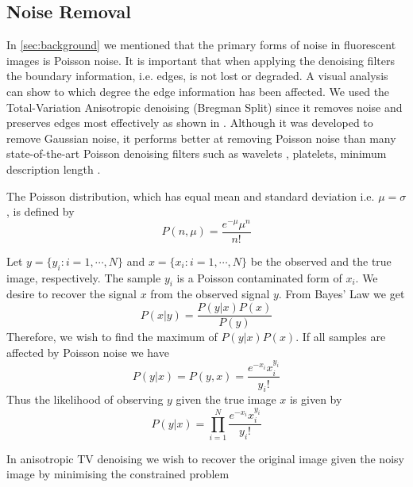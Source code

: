 \documentclass[a4paper,11pt]{ijamas}
\begin{document}
\subsection{Noise Removal}
\label{sec:proposed_noise_removal}
In \autoref{sec:background} we mentioned that the primary forms of noise in fluorescent images is Poisson noise. It is important that when applying the denoising filters the boundary information, i.e. edges, is not lost or degraded. A visual analysis can show to which degree the edge information has been affected.
We used the Total-Variation Anisotropic denoising (Bregman Split) since it removes noise and preserves edges most effectively as shown in \cite{rodriguez:2008}. Although it was developed to remove Gaussian noise, it performs better at removing Poisson noise than many state-of-the-art Poisson denoising filters \cite{rodriguez:2008,michelli:2011} such as wavelets \cite{timmermann:1999}, platelets\cite{willett:2004}, minimum description length \cite{nowak:1999}.

The Poisson distribution, which has equal mean and standard deviation i.e. $\mu = \sigma$, is defined by
\begin{equation}
	P(n,\mu) = \frac{e^{-\mu}\mu^{n}}{n!}
	\label{eq:poissondist}
\end{equation}

Let $y = \lbrace y_i:i=1, \cdots, N \rbrace$ and $x = \lbrace x_i:i=1, \cdots, N \rbrace$ be the observed and the true image, respectively. The sample $y_i$ is a Poisson contaminated form of $x_i$. We desire to recover the signal $x$ from the observed signal $y$. From Bayes' Law we get
\begin{equation}
	P(x \vert y) = \frac{P(y \vert x)P(x)}{P(y)}
	\label{eq:bayeslaw}
\end{equation}
Therefore, we wish to find the maximum of $P(y \vert x)P(x)$. If all samples are affected by Poisson noise we have
\begin{equation}
	P(y \vert x) = P(y,x) = \frac{e^{-x_i}x_i^{y_i}}{y_i!}
	\label{eq:poissonafect}
\end{equation}
Thus the likelihood of observing $y$ given the true image $x$ is given by
\begin{equation}
	P(y \vert x) = \prod_{i=1}^{N} \frac{e^{-x_i}x_i^{y_i}}{y_i!}
	\label{eq:poissonlikelihood}
\end{equation}


In anisotropic TV denoising we wish to recover the original image given the noisy image by minimising the constrained problem
\end{document}
